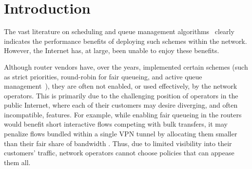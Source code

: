 \section{Introduction}\label{s:intro}



The vast literature on scheduling and queue management algorithms~\cite{diffserv, fair-queueing, sfq, pie, CoDel, fifoplus, virtualClocks, csfq, drr, red, ecn} clearly indicates the performance benefits of deploying such schemes within the network. However, the Internet has, at large, been unable to enjoy these benefits. 

Although router vendors have, over the years, implemented certain schemes (such as strict priorities, round-robin for fair queueing, and active queue management~\cite{cisco-qos}), they are often not enabled, or used effectively, by the network operators. 
This is primarily due to the challenging position of operators in the public Internet, where each of their customers may desire diverging, and often incompatible, features. For example, while enabling fair queueing in the routers would benefit short interactive flows competing with bulk transfers, it may penalize flows bundled within a single VPN tunnel by allocating them smaller than their fair share of bandwidth . 
Thus, due to limited visibility into their customers' traffic, network operators cannot choose policies that can appease them all. 

